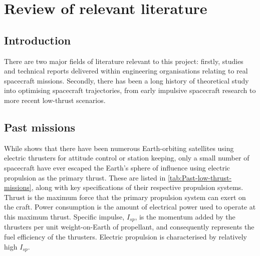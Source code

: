 \chapter{Review of relevant literature} \label{cha:Literature-review}

\section{Introduction} \label{sec:Lit-Review-Introduction}

There are two major fields of literature relevant to this project: firstly, studies and technical reports delivered within engineering organisations relating to real spacecraft missions. Secondly, there has been a long history of theoretical study into optimising spacecraft trajectories, from early impulsive spacecraft research to more recent low-thrust scenarios.

\section{Past missions} \label{sec:Past-missions}


While \textcite{LePage1991} shows that there have been numerous Earth-orbiting satellites using electric thrusters for attitude control or station keeping, only a small number of spacecraft have ever escaped the Earth's sphere of influence using electric propulsion as the primary thrust. These are listed in \autoref{tab:Past-low-thrust-missions}, along with key specifications of their respective propulsion systems. Thrust is the maximum force that the primary propulsion system can exert on the craft. Power consumption is the amount of electrical power used to operate at this maximum thrust. Specific impulse, $I_{sp}$, is the momentum added by the thrusters per unit weight-on-Earth of propellant, and consequently represents the fuel efficiency of the thrusters. Electric propulsion is characterised by relatively high $I_{sp}$.

